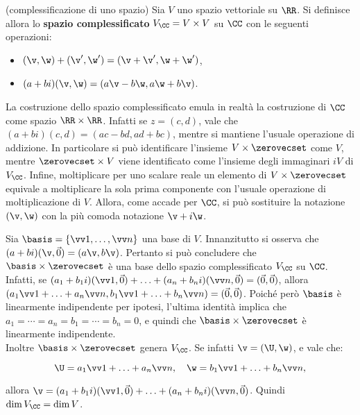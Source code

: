\begin{definition} (complessificazione di uno spazio) Sia $V$ uno spazio vettoriale su $\RR$.
	Si definisce allora lo \textbf{spazio complessificato} $V_\CC = V \times V$ su $\CC$ con le seguenti operazioni:
	
	\begin{itemize}
		\item $(\v, \w) + (\v', \w') = (\v + \v', \w + \w')$,
		\item $(a+bi)(\v, \w) = (a\v - b\w, a\w + b\v)$.
	\end{itemize}
\end{definition}

\begin{remark}
	La costruzione dello spazio complessificato emula in realtà la costruzione di $\CC$ come spazio
	$\RR \times \RR$. Infatti se $z = (c, d)$, vale che $(a + bi)(c, d) = (ac - bd, ad + bc)$, mentre
	si mantiene l'usuale operazione di addizione. In particolare si può identificare l'insieme
	$V \times \zerovecset$ come $V$, mentre $\zerovecset \times V$ viene identificato come l'insieme
	degli immaginari $iV$ di $V_\CC$. Infine, moltiplicare per uno scalare reale un elemento di
	$V \times \zerovecset$ equivale a moltiplicare la sola prima componente con l'usuale operazione
	di moltiplicazione di $V$. Allora, come accade per $\CC$, si può sostituire la notazione
	$(\v, \w)$ con la più comoda notazione $\v + i \w$.
\end{remark}

\begin{remark}
	Sia $\basis = \{ \vv 1, \ldots, \vv n \}$ una base di $V$. Innanzitutto si osserva che
	$(a+bi)(\v, \vec 0) = (a\v, b\v)$. Pertanto si può concludere che $\basis \times \zerovecset$ è
	una base dello spazio complessificato $V_\CC$ su $\CC$. \\
	
	Infatti, se $(a_1 + b_1 i)(\vv 1, \vec 0) + \ldots + (a_n + b_n i)(\vv n, \vec 0) = (\vec 0, \vec 0)$,
	allora $(a_1 \vv 1 + \ldots + a_n \vv n, b_1 \vv 1 + \ldots + b_n \vv n) = (\vec 0, \vec 0)$.
	Poiché però $\basis$ è linearmente indipendente per ipotesi, l'ultima identità implica che
	$a_1 = \cdots = a_n = b_1 = \cdots = b_n = 0$, e quindi che $\basis \times \zerovecset$ è linearmente
	indipendente. \\
	
	Inoltre $\basis \times \zerovecset$ genera $V_\CC$. Se infatti $\v = (\U, \w)$, e vale che:
	
	\[ \U = a_1 \vv 1 + \ldots + a_n \vv n, \quad \w = b_1 \vv 1 + \ldots + b_n \vv n, \]
	
	\vskip 0.1in
	
	allora $\v = (a_1 + b_1 i) (\vv 1, \vec 0) + \ldots + (a_n + b_n i) (\vv n, \vec 0)$. Quindi
	$\dim V_\CC = \dim V$.
\end{remark}

